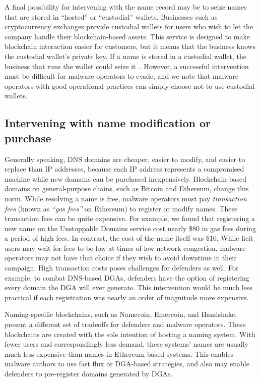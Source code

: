 A final possibility for intervening with the name record may be to seize 
names that are stored in ``hosted'' or ``custodial'' wallets. Businesses such 
as cryptocurrency exchanges provide custodial wallets for users who wish to let 
the company handle their blockchain-based assets. This service is designed to 
make blockchain interaction easier for customers, but it means that the 
business knows the custodial wallet's private key. If a name is stored in a 
custodial wallet, the business that runs the wallet 
could seize it~\cite{pegoraro_blockchain_2021}. However, a 
successful intervention must be difficult for malware operators to 
evade, and we note that malware operators with good operational practices can 
simply choose not to use custodial wallets. 

\subsection{Intervening with name modification or purchase}

Generally speaking, DNS domains are cheaper, easier to modify, and 
easier to replace than IP addresses, because each IP address 
represents a compromised machine while new domains can be 
purchased inexpensively. Blockchain-based domains on 
general-purpose chains, such as Bitcoin and Ethereum, 
change this norm. While resolving a name is free, malware 
operators must pay \emph{transaction fees} 
(known as \emph{``gas fees''} on Ethereum)
to register or modify names. These transaction fees 
can be quite expensive. For example, we found that 
registering a new name on the Unstoppable Domains service 
cost nearly \$80 in gas fees during a period of high fees. 
In contrast, the cost of the name itself was \$10. While 
licit users may wait for fees to be low at times of low 
network congestion, malware operators may not have that 
choice if they wish to avoid downtime in their campaign. High 
transaction costs poses challenges for defenders as well. For 
example, to combat DNS-based DGAs, defenders have the option 
of registering every domain the DGA will ever generate. This 
intervention would be much less practical if each 
registration was nearly an order of magnitude more expensive.

Naming-specific blockchains, such as Namecoin, Emercoin, and Handshake, 
present a different set of tradeoffs for defenders and malware 
operators. These 
blockchains are created with the sole intention of hosting a naming system. 
With fewer users and correspondingly less demand, these systems' names are 
usually much less expensive than names in Ethereum-based systems. This enables 
malware authors to use fast flux or DGA-based strategies, and also may enable 
defenders to pre-register domains generated by DGAs. 






